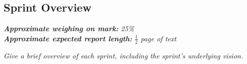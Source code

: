 \subsection{Sprint Overview}

\emph{\textbf{Approximate weighing on mark:} 25\%}							\\
\emph{\textbf{Approximate expected report length:} $\frac{1}{2}$ page of text}

\emph{Give a brief overview of each sprint, including the sprint's underlying vision.}
